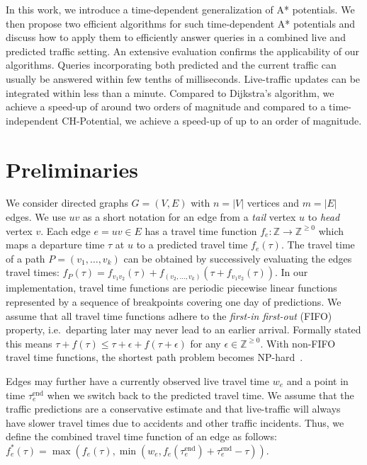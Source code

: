 \documentclass[a4paper,UKenglish,cleveref, autoref, thm-restate]{lipics-v2021}
\newcommand*{\pred}{f}
\newcommand*{\comb}{f^*}
\begin{document}
In this work, we introduce a time-dependent generalization of A* potentials.
We then propose two efficient algorithms for such time-dependent A* potentials and discuss how to apply them to efficiently answer queries in a combined live and predicted traffic setting.
An extensive evaluation confirms the applicability of our algorithms.
Queries incorporating both predicted and the current traffic can usually be answered within few tenths of milliseconds.
Live-traffic updates can be integrated within less than a minute.
Compared to Dijkstra's algorithm, we achieve a speed-up of around two orders of magnitude and compared to a time-independent CH-Potential, we achieve a speed-up of up to an order of magnitude.

\section{Preliminaries}
We consider directed graphs $G=(V,E)$ with $n=|V|$ vertices and $m=|E|$ edges.
We use $uv$ as a short notation for an edge from a \emph{tail} vertex $u$ to \emph{head} vertex $v$.
Each edge $e = uv \in E$ has a travel time function $\pred_e : \mathbb{Z} \to \mathbb{Z}^{\geq 0}$ which maps a departure time $\tau$ at $u$ to a predicted travel time $\pred_e(\tau)$.
The travel time of a path $P = (v_1,\dots,v_k)$ can be obtained by successively evaluating the edges travel times: $\pred_P(\tau) = \pred_{v_1 v_2}(\tau) + \pred_{(v_2,\dots,v_k)}(\tau + \pred_{v_1 v_2}(\tau))$.
In our implementation, travel time functions are periodic piecewise linear functions represented by a sequence of breakpoints covering one day of predictions.
We assume that all travel time functions adhere to the \emph{first-in first-out} (FIFO) property, i.e.\ departing later may never lead to an earlier arrival.
Formally stated this means $\tau + \pred(\tau) \leq \tau + \epsilon + \pred(\tau + \epsilon)$ for any $\epsilon \in \mathbb{Z}^{\geq 0}$.
With non-FIFO travel time functions, the shortest path problem becomes \textsf{NP}-hard~\cite{or-tnp-89}.

Edges may further have a currently observed live travel time $w_e$ and a point in time $\tau_e^{\operatorname{end}}$ when we switch back to the predicted travel time.
We assume that the traffic predictions are a conservative estimate and that live-traffic will always have slower travel times due to accidents and other traffic incidents.
Thus, we define the combined travel time function of an edge as follows:
$\comb_e(\tau) = \max(\pred_e(\tau), \min(w_e, \pred_e(\tau_e^{\operatorname{end}}) + \tau_e^{\operatorname{end}} - \tau))$.
\end{document}
